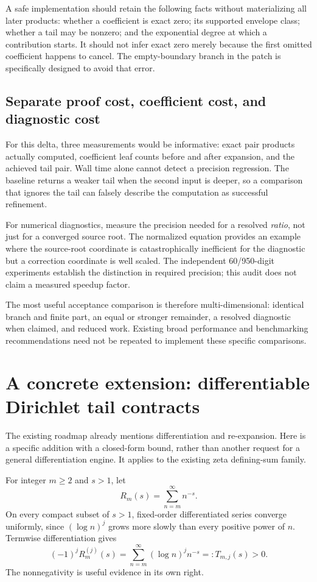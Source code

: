 \documentclass[11pt,letterpaper]{article}
\begin{document}
A safe implementation should retain the following facts without materializing
all later products: whether a coefficient is exact zero; its supported envelope
class; whether a tail may be nonzero; and the exponential degree at which a
contribution starts. It should not infer exact zero merely because the first
omitted coefficient happens to cancel. The empty-boundary branch in the patch
is specifically designed to avoid that error.

\subsection{Separate proof cost, coefficient cost, and diagnostic cost}
For this delta, three measurements would be informative: exact pair products
actually computed, coefficient leaf counts before and after expansion, and
the achieved tail pair. Wall time alone cannot detect a precision regression.
The baseline returns a weaker tail when the second input is deeper, so a
comparison that ignores the tail can falsely describe the computation as
successful refinement.

For numerical diagnostics, measure the precision needed for a resolved
\emph{ratio}, not just for a converged source root. The normalized equation
provides an example where the source-root coordinate is catastrophically
inefficient for the diagnostic but a correction coordinate is well scaled.
The independent 60/950-digit experiments establish the distinction in required
precision; this audit does not claim a measured speedup factor.

The most useful acceptance comparison is therefore multi-dimensional:
identical branch and finite part, an equal or stronger remainder, a resolved
diagnostic when claimed, and reduced work. Existing broad performance and
benchmarking recommendations need not be repeated to implement these specific
comparisons.

\section{A concrete extension: differentiable Dirichlet tail contracts}
\label{sec:dirichlet-extension}
The existing roadmap already mentions differentiation and re-expansion.
Here is a specific addition with a closed-form bound, rather than another
request for a general differentiation engine. It applies to the existing
zeta defining-sum family.\cite{dirichlet,status}

For integer $m\ge2$ and $s>1$, let
\[
 R_m(s)=\sum_{n=m}^{\infty}n^{-s}.
\]
On every compact subset of $s>1$, fixed-order differentiated series converge
uniformly, since $(\log n)^j$ grows more slowly than every positive power of
$n$. Termwise differentiation gives
\[
 (-1)^j R_m^{(j)}(s)
   =\sum_{n=m}^{\infty}(\log n)^j n^{-s}=:T_{m,j}(s)>0.
\]
The nonnegativity is useful evidence in its own right.
\end{document}
